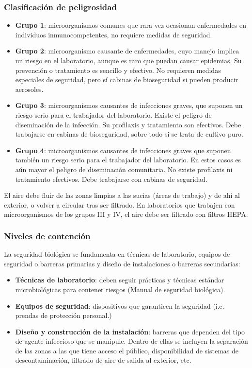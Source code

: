 \subsubsection{Clasificación de peligrosidad}
\begin{itemize}[itemsep=0pt,parsep=0pt,topsep=0pt,partopsep=0pt]
    \item\textbf{Grupo 1}: microorganismos comunes que rara vez ocasionan enfermedades en individuos inmunocompetentes, no requiere medidas de seguridad.
    \item\textbf{Grupo 2}: microorganismo causante de enfermedades, cuyo manejo implica un riesgo en el laboratorio, aunque es raro que puedan causar epidemias. Su prevención o tratamiento es sencillo y efectivo. No requieren medidas especiales de seguridad, pero sí cabinas de bioseguridad si pueden producir aerosoles.
    \item\textbf{Grupo 3}: microorganismos causantes de infecciones graves, que suponen un riesgo serio para el trabajador del laboratorio. Existe el peligro de diseminación de la infección. Su profilaxis y tratamiento son efectivos. Debe trabajarse en cabinas de bioseguridad, sobre todo si se trata de cultivo puro.
    \item\textbf{Grupo 4}: microorganismos causantes de infecciones graves que suponen también un riesgo serio para el trabajador del laboratorio. En estos casos es aún mayor el peligro de diseminación comunitaria. No existe profilaxis ni tratamiento efectivos. Debe trabajarse con cabinas de seguridad.
\end{itemize}

El aire debe fluir de las zonas limpias a las sucias (áreas de trabajo) y de ahí al exterior, o volver a circular tras ser filtrado. En laboratorios que trabajen con microorganismos de los grupos III y IV, el aire debe ser filtrado con filtros HEPA.
\subsubsection{Niveles de contención}
La seguridad biológica se fundamenta en técnicas de laboratorio, equipos de seguridad o barreras primarias y diseño de instalaciones o barreras secundarias:
\begin{itemize}[itemsep=0pt,parsep=0pt,topsep=0pt,partopsep=0pt]
    \item \textbf{Técnicas de laboratorio}: deben seguir prácticas y técnicas estándar microbiológicas para contener riesgos (Manual de seguridad biológica).
    \item\textbf{Equipos de seguridad}: dispositivos  que garanticen la seguridad (i.e. prendas de protección personal.)
    \item\textbf{Diseño y construcción de la instalación}: barreras que dependen del tipo de agente infeccioso que se manipule. Dentro de ellas se incluyen la separación de las zonas a las que tiene acceso el público, disponibilidad de sistemas de descontaminación, filtrado de aire de salida al exterior, etc.
\end{itemize}

